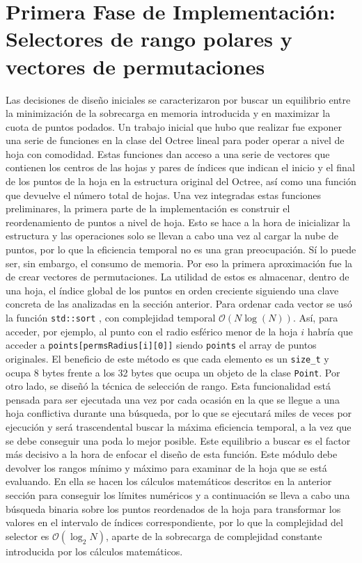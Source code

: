 \section{Primera Fase de Implementación: Selectores de rango polares y vectores de permutaciones}
Las decisiones de diseño iniciales se caracterizaron por buscar un equilibrio entre la minimización de la sobrecarga en memoria introducida y en maximizar la cuota de puntos podados.
Un trabajo inicial que hubo que realizar fue exponer una serie de funciones en la clase del Octree lineal para poder operar a nivel de hoja con comodidad. Estas funciones dan acceso a una serie de vectores que contienen los centros de las hojas y pares de índices que indican el inicio y el final de los puntos de la hoja en la estructura original del Octree, así como una función que devuelve el número total de hojas.
Una vez integradas estas funciones preliminares, la primera parte de la implementación es construir el reordenamiento de puntos a nivel de hoja. Esto se hace a la hora de inicializar la estructura y las operaciones solo se llevan a cabo una vez al cargar la nube de puntos, por lo que la eficiencia temporal no es una gran preocupación. Sí lo puede ser, sin embargo, el consumo de memoria. Por eso la primera aproximación fue la de crear vectores de permutaciones. La utilidad de estos es almacenar, dentro de una hoja, el índice global de los puntos en orden creciente siguiendo una clave concreta de las analizadas en la sección anterior. Para ordenar cada vector se usó la función \texttt{std::sort} \cite{cppref_sort}, con complejidad temporal $\mathcal{O}(N \log(N))$.
Así, para acceder, por ejemplo, al punto con el radio esférico menor de la hoja $i$ habría que acceder a \texttt{points[permsRadius[i][0]]} siendo \texttt{points} el array de puntos originales. El beneficio de este método es que cada elemento es un \texttt{size\_t} y ocupa 8 bytes frente a los 32 bytes que ocupa un objeto de la clase \texttt{Point}.
Por otro lado, se diseñó la técnica de selección de rango. Esta funcionalidad está pensada para ser ejecutada una vez por cada ocasión en la que se llegue a una hoja conflictiva durante una búsqueda, por lo que se ejecutará miles de veces por ejecución y será trascendental buscar la máxima eficiencia temporal, a la vez que se debe conseguir una poda lo mejor posible. Este equilibrio a buscar es el factor más decisivo a la hora de enfocar el diseño de esta función. Este módulo debe devolver los rangos mínimo y máximo para examinar de la hoja que se está evaluando. En ella se hacen los cálculos matemáticos descritos en la anterior sección para conseguir los límites numéricos y a continuación se lleva a cabo una búsqueda binaria sobre los puntos reordenados de la hoja para transformar los valores en el intervalo de índices correspondiente, por lo que la complejidad del selector es $\mathcal{O}(\log_2N)$, aparte de la sobrecarga de complejidad constante introducida por los cálculos matemáticos.
 
